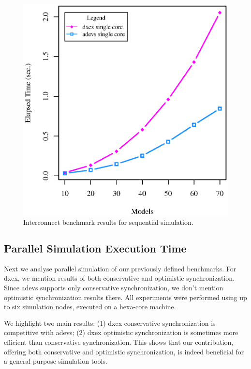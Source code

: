 \begin{figure}
    \center
	\includegraphics[width=\plotfraction\columnwidth]{fig/interconnect_sequential.eps}
	\caption{Interconnect benchmark results for sequential simulation.}
	\label{fig:Interconnect_benchmark}
\end{figure}

\subsection{Parallel Simulation Execution Time}
Next we analyse parallel simulation of our previously defined benchmarks.
For dxex, we mention results of both conservative and optimistic synchronization.
Since adevs supports only conservative synchronization, we don't mention optimistic synchronization results there.
All experiments were performed using up to six simulation nodes, executed on a hexa-core machine.

We highlight two main results:
(1) dxex conservative synchronization is competitive with adevs;
(2) dxex optimistic synchronization is sometimes more efficient than conservative synchronization.
This shows that our contribution, offering both conservative and optimistic synchronization, is indeed beneficial for a general-purpose simulation tools.

